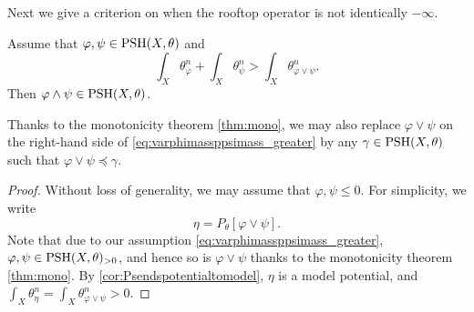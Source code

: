 Next we give a criterion on when the rooftop operator is not identically $-\infty$.
\begin{proposition}\label{prop:landfinitecond1}
    Assume that $\varphi,\psi\in \mathrm{PSH}(X,\theta)$ and
    \begin{equation}\label{eq:varphimassppsimass_greater}
        \int_X \theta_{\varphi}^n+\int_X \theta_{\psi}^n>\int_X \theta_{\varphi\lor\psi}^n.
    \end{equation}
    Then $\varphi\land \psi\in \mathrm{PSH}(X,\theta)$.
\end{proposition}
Thanks to the monotonicity theorem \cref{thm:mono}, we may also replace $\varphi\lor \psi$ on the right-hand side of \eqref{eq:varphimassppsimass_greater} by any $\gamma\in \mathrm{PSH}(X,\theta)$ such that $\varphi\lor \psi\preceq \gamma$.
\begin{proof}
    Without loss of generality, we may assume that $\varphi,\psi\leq 0$. For simplicity, we write
    \[
    \eta=P_{\theta}[\varphi\lor \psi].
    \]
    Note that due to our assumption \eqref{eq:varphimassppsimass_greater}, $\varphi,\psi\in \mathrm{PSH}(X,\theta)_{>0}$, and hence so is $\varphi\lor \psi$ thanks to the monotonicity theorem \cref{thm:mono}.
    By \cref{cor:Psendspotentialtomodel}, $\eta$ is a model potential, and $\int_X\theta_\eta^n=\int_X\theta_{\varphi\lor\psi}^n>0$.


\end{proof}
